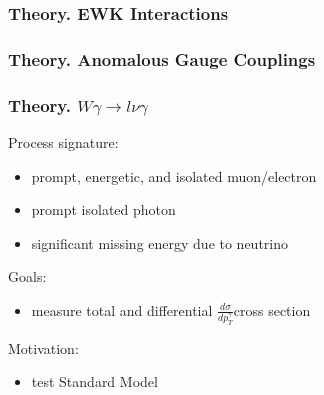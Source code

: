 \begin{frame}\frametitle{Theory. EWK Interactions}
\end{frame}%

\begin{frame}\frametitle{Theory. Anomalous Gauge Couplings}
\end{frame}%

\begin{frame}\frametitle{Theory. $W\gamma\rightarrow l\nu\gamma$}
\scriptsize
\begin{figure}[htb]
\begin{center}
\scriptsize
\end{center}
\end{figure}
\scriptsize
Process signature:\\
\begin{itemize}
\item prompt, energetic, and isolated muon/electron
\item prompt isolated photon
\item significant missing energy due to neutrino 
\end{itemize}
Goals:\\
\begin{itemize}
\item measure total and differential $\frac{d\sigma}{dp_{T}^{\gamma}}$cross section
\end{itemize}
Motivation:\\
\begin{itemize}
\item test Standard Model
\end{itemize}
\end{frame}%
